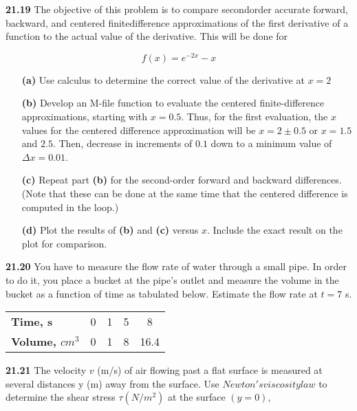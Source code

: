 \documentclass[../main.tex]{subfiles}
\begin{document}
\begin{multicols}{2}
\begin{tabular}{lccccccccccc}
\hline
\end{tabular}

\textbf{21.19} The objective of this problem is to compare secondorder accurate forward, backward, and centered finitedifference approximations of the first derivative of a function
to the actual value of the derivative. This will be done for

	$$f(x) = e^{-2x} - x$$

\begin{enumerate}
	\item[\textbf{(a)}] Use calculus to determine the correct value of the derivative at $x = 2$
	
	\item[\textbf{(b)}] Develop an M-file function to evaluate the centered
finite-difference approximations, starting with $x=0.5$. Thus, for the first evaluation, the $x$ values for the centered difference approximation will be $x = 2 \pm 0.5$ or
$x = 1.5$ and $2.5$. Then, decrease in increments of $0.1$
down to a minimum value of $\Delta x = 0.01$.

	\item[\textbf{(c)}] Repeat part \textbf{(b)} for the second-order forward and backward differences. (Note that these can be done at the same
time that the centered difference is computed in the loop.)
 
	\item[\textbf{(d)}] Plot the results of \textbf{(b)} and \textbf{(c)} versus $x$. Include the exact
result on the plot for comparison. 
\end{enumerate}

\textbf{21.20} You have to measure the flow rate of water through a
small pipe. In order to do it, you place a bucket at the pipe's
outlet and measure the volume in the bucket as a function of
time as tabulated below. Estimate the flow rate at $t = 7$ s.\\
\begin{tabular}{lcccc}
\hline

	{\textbf{Time, s}} & {0} & {1} & {5} & {8}\\
	
	{\textbf{Volume, $cm^{3}$}} & {0} & {1} & {8} & {16.4}\\

\hline
\end{tabular}

\textbf{21.21} The velocity $v$ (m/s) of air flowing past a flat surface
is measured at several distances y (m) away from the surface. Use $Newton's viscosity law$ to determine the shear stress $\tau (N/m^{2})$ at the surface $(y=0)$,


\end{multicols}
\end{document}
